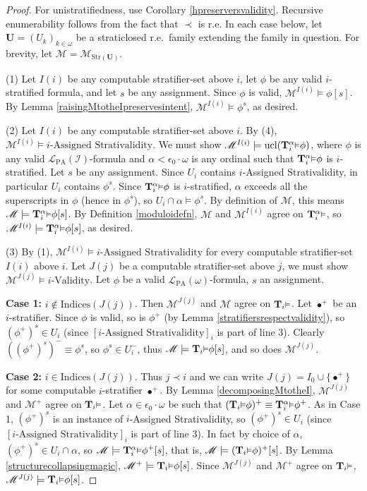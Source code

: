 \documentclass[reqno]{article}
\theoremstyle{definition}
\def\L{\mathscr{L}}
\def\M{\mathscr{M}}
\def\T{\mathbf{T}}
\def\U{\mathbf{U}}
\def\indices{\mathrm{Indices}}
\def\LPA{\L_{\mathrm{PA}}}
\def\epom{\epsilon_0\cdot\omega}
\def\indset{\mathcal I}
\renewcommand{\Pr}[1]{\T_{#1}\mbox{\small${\vDash}$}}
\newcommand{\Prr}[2]{\T^{#1}_{#2}\mbox{\small${\vDash}$}}
\newcommand{\ucl}[1]{\mathrm{ucl}(#1)}
\newcommand{\case}[1]{\textbf{Case #1:}}
\newcommand{\str}[1]{\mathrm{Str}(#1)} \newcommand{\Str}[1]{\str{#1}}
\begin{document}
\begin{proof}
For unistratifiedness, use Corollary \ref{hpreserversvalidity}.
Recursive enumerability follows from the fact that $\prec$ is r.e.
In each case below, let $\U=(U_k)_{k\in\omega}$ be a straticlosed r.e.~family
extending the family in question. For brevity, let $\M=\M_{\str\U}$.

\item
(1)
Let $I(i)$ be any computable stratifier-set above $i$, let $\phi$ be any
valid $i$-stratified formula, and let $s$ be any assignment.
Since $\phi$ is valid, $\M^{I(i)}\models \phi[s]$.
By Lemma \ref{raisingMtotheIpreservesintent}, $\M^{I(i)}\models\phi^s$,
as desired.

\item
(2)
Let $I(i)$ be any computable stratifier-set above $i$.
By (4), $\M^{I(i)}\models \mbox{$i$-Assigned Strativalidity}$.
We must show $\M^{I(i)}\models \ucl{\Prr\alpha i\phi}$, where $\phi$
is any valid $\LPA(\indset)$-formula and $\alpha<\epom$ is any ordinal
such that $\Prr\alpha i\phi$ is $i$-stratified.
Let $s$ be any assignment. Since $U_i$ contains
$i$-Assigned Strativalidity, in particular $U_i$ contains $\phi^s$.
Since $\Prr\alpha i\phi$ is $i$-stratified, $\alpha$ exceeds all the
superscripts in $\phi$ (hence in $\phi^s$), so $U_i\cap\alpha\models \phi^s$.
By definition of $\M$, this means $\M\models\Prr\alpha i\phi[s]$.
By Definition \ref{moduloidefn}, $\M$ and $\M^{I(i)}$ agree on $\Prr\alpha i$,
so $\M^{I(i)}\models\Prr\alpha i\phi[s]$, as desired.

\item
(3)
By (1), $\M^{I(i)}\models\mbox{$i$-Assigned Strativalidity}$
for every computable stratifier-set $I(i)$ above $i$.
Let $J(j)$ be a computable stratifier-set above $j$, we must
show $\M^{J(j)}\models \mbox{$i$-Validity}$.
Let $\phi$ be a valid $\LPA(\omega)$-formula, $s$
an assignment.

\item
\case1
$i\not\in\indices(J(j))$.
Then $\M^{J(j)}$ and $\M$ agree on $\Pr i$.
Let $\bullet^+$ be an $i$-stratifier.
Since $\phi$ is valid, so is $\phi^+$
(by Lemma \ref{stratifiersrespectvalidity}),
so $(\phi^+)^s\in U_i$ (since $[\mbox{$i$-Assigned Strativalidity}]_i$ is
part of line 3).
Clearly $((\phi^+)^s)^-\equiv\phi^s$, so $\phi^s\in U^-_i$,
thus $\M\models \Pr i\phi[s]$, and so does $\M^{J(j)}$.

\item
\case2
$i\in\indices(J(j))$.
Thus $j\prec i$ and we can write $J(j)=I_0\cup\{\bullet^+\}$
for some computable $i$-stratifier $\bullet^+$.
By Lemma \ref{decomposingMtotheI}, $\M^{J(j)}$ and
$\M^+$ agree on $\Pr i$.
Let $\alpha\in\epom$ be such that
$(\Pr i\phi)^+\equiv \Prr\alpha i\phi^+$.
As in Case 1, $(\phi^+)^s$ is an instance of
$i$-Assigned Strativalidity,
so $(\phi^+)^s\in U_i$
(since $[\mbox{$i$-Assigned Strativalidity}]_i$ is
part of line 3).
In fact by choice of $\alpha$, $(\phi^+)^s\in U_i\cap \alpha$,
so $\M\models \Prr\alpha i\phi^+[s]$,
that is, $\M\models (\Pr i\phi)^+[s]$.
By Lemma \ref{structurecollapsingmagic},
$\M^+\models\Pr i\phi[s]$.
Since $\M^{J(j)}$ and $\M^+$ agree on $\Pr i$,
$\M^{J(j)}\models\Pr i\phi[s]$.
\end{proof}
\end{document}
